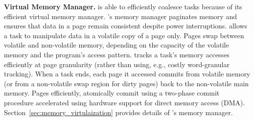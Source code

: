 \textbf{Virtual Memory Manager.} \sys is able to efficiently coalesce
tasks because of its efficient virtual memory manager. \sys's memory manager
paginates memory and ensures that data in a page remain consistent despite
power interruptions. \sys allows a task to manipulate data in a volatile copy
of a page only. Pages swap between volatile and non-volatile memory, depending
on the capacity of the volatile memory and the program's access pattern. \sys
tracks a task's memory accesses efficiently at page granularity (rather than
using, e.g., costly word-granular tracking). When a task ends, each page it
accessed commits from volatile memory (or from a non-volatile swap region for
dirty pages) back to the non-volatile main memory. Pages efficiently,
atomically commit using a two-phase commit procedure accelerated using hardware
support for direct memory access (DMA). Section~\ref{sec:memory_virtulaization}
provides details of \sys's memory manager.